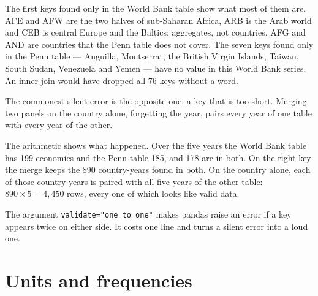 \label{lst:b1:economic-data-python:join}

\label{out:b1:economic-data-python:join}

The first keys found only in the World Bank table show what most of them
are. AFE and AFW are the two halves of sub-Saharan Africa, ARB is the Arab
world and CEB is central Europe and the Baltics: aggregates, not countries.
AFG and AND are countries that the Penn table does not cover. The seven keys
found only in the Penn table --- Anguilla, Montserrat, the British Virgin
Islands, Taiwan, South Sudan, Venezuela and Yemen --- have no value in this
World Bank series. An inner join would have dropped all 76 keys without a
word.

The commonest silent error is the opposite one: a key that is too short.
Merging two panels on the country alone, forgetting the year, pairs every
year of one table with every year of the other.

\label{lst:b1:economic-data-python:trap}

\label{out:b1:economic-data-python:trap}

The arithmetic shows what happened. Over the five years the World Bank
table has 199 economies and the Penn table 185, and 178 are in both. On the
right key the merge keeps the 890 country-years found in both. On the
country alone, each of those country-years is paired with all five years of
the other table: $890 \times 5 = 4{,}450$ rows, every one of which looks like
valid data.

The argument \texttt{validate="one\_to\_one"} makes pandas raise an error if
a key appears twice on either side. It costs one line and turns a silent
error into a loud one.

\section{Units and frequencies}\label{sec:b1:economic-data-python:units}

